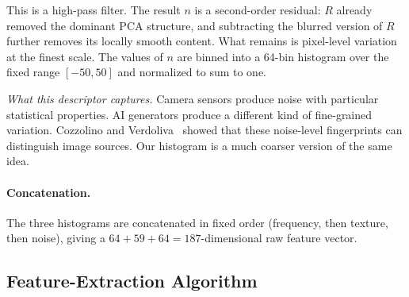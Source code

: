 \documentclass[runningheads]{llncs}
\begin{document}
This is a high-pass filter. The result $n$ is a second-order residual: $R$ already removed the dominant PCA structure, and subtracting the blurred version of $R$ further removes its locally smooth content. What remains is pixel-level variation at the finest scale. The values of $n$ are binned into a 64-bin histogram over the fixed range $[-50, 50]$ and normalized to sum to one.

\textit{What this descriptor captures.} Camera sensors produce noise with particular statistical properties. AI generators produce a different kind of fine-grained variation. Cozzolino and Verdoliva~\cite{cozzolino2018} showed that these noise-level fingerprints can distinguish image sources. Our histogram is a much coarser version of the same idea.

\paragraph{Concatenation.} The three histograms are concatenated in fixed order (frequency, then texture, then noise), giving a $64 + 59 + 64 = 187$-dimensional raw feature vector.


\subsection{Feature-Extraction Algorithm}
\end{document}
